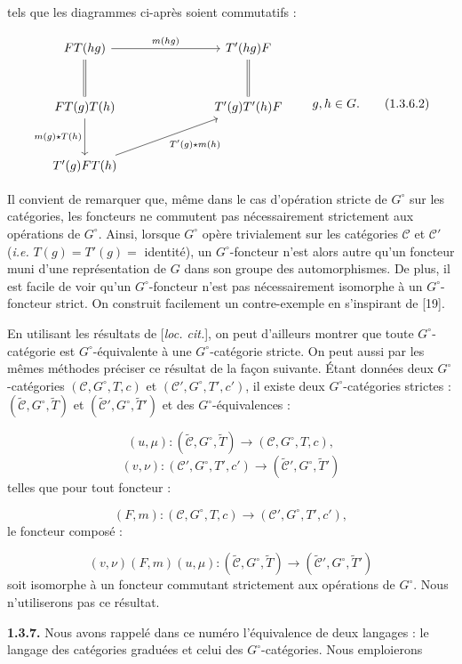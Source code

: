 %
tels que les diagrammes ci-après soient commutatifs :

\begin{equation}
  \begin{tikzcd}[column sep=7em,row sep=3em]
    FT(hg) \arrow[r,"m(hg)"] \arrow[d,equal] &
      T'(hg)F \arrow[d,equal] \\
    FT(g)T(h) \arrow[d,"m(g)\mathbin{\star}T(h)"'] &
      T'(g)T'(h)F \\
    T'(g)FT(h) \arrow[ur,"T'(g)\mathbin{\star}m(h)"'] &
  \end{tikzcd}
  \qquad g,h\in G.
  \tag{1.3.6.2}
\end{equation}

Il convient de remarquer que, même dans le cas d'opération stricte de
$G^\circ$ sur les catégories, les foncteurs ne commutent pas
nécessairement strictement aux opérations de $G^\circ$. Ainsi, lorsque
$G^\circ$ opère trivialement sur les catégories $\mathcal C$ et
$\mathcal C'$ (\textit{i.e.} $T(g)=T'(g)=$ identité), un
$G^\circ$-foncteur n'est alors autre qu'un foncteur muni d'une
représentation de $G$ dans son groupe des automorphismes. De plus, il est
facile de voir qu'un $G^\circ$-foncteur n'est pas nécessairement
isomorphe à un $G^\circ$-foncteur strict. On construit facilement un
contre-exemple en s'inspirant de [19].

En utilisant les résultats de [\emph{loc. cit.}], on peut d'ailleurs
montrer que toute $G^\circ$-catégorie est $G^\circ$-équivalente à une
$G^\circ$-catégorie stricte. On peut aussi par les mêmes méthodes
préciser ce résultat de la façon suivante. Étant données deux
$G^\circ$-catégories $(\mathcal C,G^\circ,T,c)$ et
$(\mathcal C',G^\circ,T',c')$, il existe deux $G^\circ$-catégories
strictes : $(\widetilde{\mathcal C},G^\circ,\widetilde T)$ et
$(\widetilde{\mathcal C}',G^\circ,\widetilde T')$ et des
$G^\circ$-équivalences :

\[
  (u,\mu)\colon
  (\widetilde{\mathcal C},G^\circ,\widetilde T)
  \longrightarrow
  (\mathcal C,G^\circ,T,c),
\]
\[
  (v,\nu)\colon
  (\mathcal C',G^\circ,T',c')
  \longrightarrow
  (\widetilde{\mathcal C}',G^\circ,\widetilde T')
\]
telles que pour tout foncteur :

\[
  (F,m)\colon
  (\mathcal C,G^\circ,T,c)
  \longrightarrow
  (\mathcal C',G^\circ,T',c'),
\]
le foncteur composé :

\[
  (v,\nu)(F,m)(u,\mu)\colon
  (\widetilde{\mathcal C},G^\circ,\widetilde T)
  \longrightarrow
  (\widetilde{\mathcal C}',G^\circ,\widetilde T')
\]
soit isomorphe à un foncteur commutant strictement aux opérations de
$G^\circ$. Nous n'utiliserons pas ce résultat.

\noindent\textbf{1.3.7.}\quad
Nous avons rappelé dans ce numéro l'équivalence de deux langages : le
langage des catégories graduées et celui des $G^\circ$-catégories. Nous
emploierons
